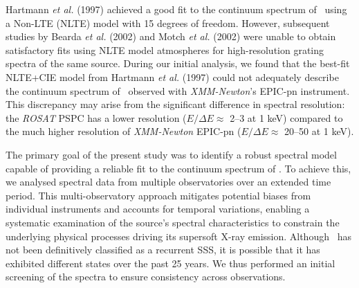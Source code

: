 	Hartmann \textit{et al.} (1997) \cite{hartmann1999constraining} achieved a good fit to the continuum spectrum of \source\ using a Non-LTE (NLTE) model with 15 degrees of freedom. However, subsequent studies by Bearda \textit{et al.} (2002) \cite{beardaChandra2002AA} and Motch \textit{et al.} (2002) \cite{motchXmmNewton2002AA} were unable to obtain satisfactory fits using NLTE model atmospheres for high-resolution grating spectra of the same source. During our initial analysis, we found that the best-fit NLTE+CIE model from Hartmann \textit{et al.} (1997) \cite{hartmann1999constraining} could not adequately describe the continuum spectrum of \source\ observed with \textit{XMM-Newton}'s EPIC-pn instrument. This discrepancy may arise from the significant difference in spectral resolution: the \textit{ROSAT} PSPC has a lower resolution ($E/\Delta E\approx$ 2--3 at 1 keV) compared to the much higher resolution of \textit{XMM-Newton} EPIC-pn ($E/\Delta E\approx$ 20--50 at 1 keV).
	
	The primary goal of the present study was to identify a robust spectral model capable of providing a reliable fit to the continuum spectrum of \source. To achieve this, we analysed spectral data from multiple observatories over an extended time period. This multi-observatory approach mitigates potential biases from individual instruments and accounts for temporal variations, enabling a systematic examination of the source’s spectral characteristics to constrain the underlying physical processes driving its supersoft X-ray emission. Although \source\ has not been definitively classified as a recurrent SSS, it is possible that it has exhibited different states over the past 25 years. We thus performed an initial screening of the spectra to ensure consistency across observations.	
	
